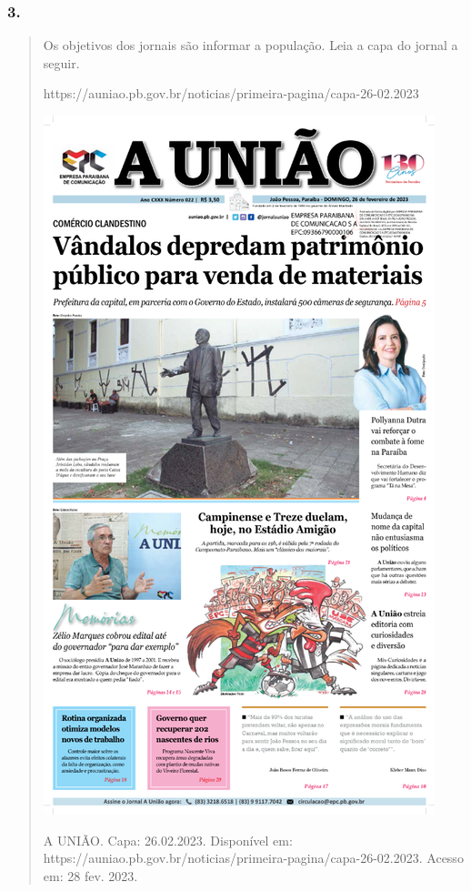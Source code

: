 \subsubsection{3. }\label{section-92}

\begin{quote}
Os objetivos dos jornais são informar a população. Leia a capa do jornal
a seguir.

https://auniao.pb.gov.br/noticias/primeira-pagina/capa-26-02.2023

\includegraphics[width=4.47917in,height=8.00000in]{media/image37.png}

A UNIÃO. Capa: 26.02.2023. Disponível em:
https://auniao.pb.gov.br/noticias/primeira-pagina/capa-26-02.2023.
Acesso em: 28 fev. 2023.


\end{quote}
